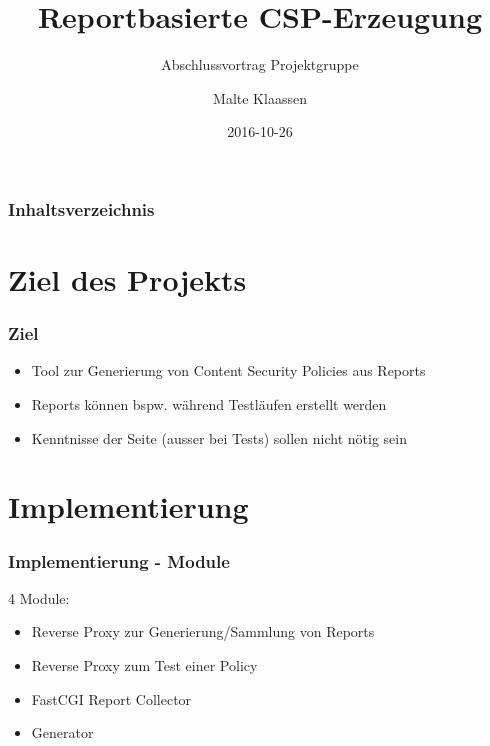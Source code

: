 \documentclass[handout]{beamer}
\title[Reportbasierte CSP Erzeugung]{Reportbasierte CSP-Erzeugung}
\subtitle{Abschlussvortrag Projektgruppe}
\author[Klaassen]{Malte Klaassen}
\date{2016-10-26}
\begin{document}
\begin{frame}%
\titlepage
\end{frame}

\begin{frame}%
	\frametitle{Inhaltsverzeichnis}
	\tableofcontents%
\end{frame}

\section{Ziel des Projekts}

\begin{frame}
\frametitle{Ziel}
\begin{itemize}
\item Tool zur Generierung von Content Security Policies aus Reports
\item Reports k\"onnen bspw. w\"ahrend Testl\"aufen erstellt werden
\item Kenntnisse der Seite (ausser bei Tests) sollen nicht n\"otig sein
\end{itemize}
\end{frame}

\section{Implementierung}

\begin{frame}
\frametitle{Implementierung - Module}
4 Module:
\begin{itemize}
\item Reverse Proxy zur Generierung/Sammlung von Reports
\item Reverse Proxy zum Test einer Policy
\item FastCGI Report Collector 
\item Generator
\end{itemize}
\end{frame}
\end{document}
